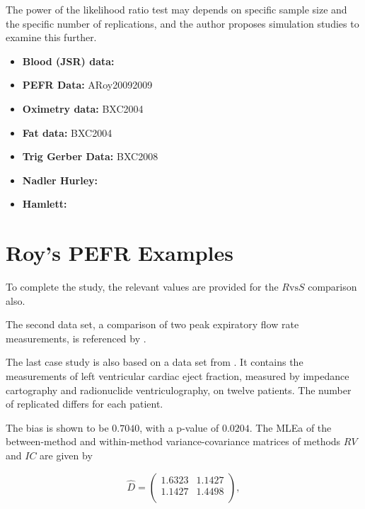 \documentclass[12pt, a4paper]{report}
\theoremstyle{plain}
\theoremstyle{definition}
\theoremstyle{remark}
\begin{document}
The power of the
likelihood ratio test may depends on specific sample size and the
specific number of  replications, and the author proposes
simulation studies to examine this further.

\newpage
\begin{itemize}
\item \textbf{Blood (JSR) data:} 
\item \textbf{PEFR Data:} ARoy20092009
\item \textbf{Oximetry data:} BXC2004
\item \textbf{Fat data:} BXC2004
\item \textbf{Trig Gerber Data:} BXC2008
\item \textbf{Nadler Hurley:}
\item \textbf{Hamlett:}
\end{itemize}




\section{Roy's PEFR Examples}



To complete the study, the relevant values are provided for the $R \mbox{vs} S$ comparison also.


The second data set, a comparison of two peak expiratory flow rate measurements, is referenced by \citet{BA86}.


The last case study is also based on a data set from  \citet{BA99}. It contains the measurements of left ventricular cardiac eject fraction, measured by impedance cartography and radionuclide ventriculography, on twelve patients.
The number of replicated differs for each patient.

The bias is shown to be $0.7040$, with a p-value of $0.0204$. The MLEa of the between-method and within-method variance-covariance matrices of methods $RV$ and $IC$ are given by

\begin{equation}\hat{D}=\left(
\begin{array}{cc}
1.6323 & 1.1427 \\
1.1427 & 1.4498 \\
\end{array}
\right),
\end{equation}
\end{document}
